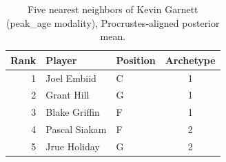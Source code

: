 \begin{table}[htbp]
  \centering\small
  \begin{tabular}{rllc}
    \toprule
    Rank & Player & Position & Archetype \\
    \midrule
    1 & Joel Embiid & C & 1 \\
    2 & Grant Hill & G & 1 \\
    3 & Blake Griffin & F & 1 \\
    4 & Pascal Siakam & F & 2 \\
    5 & Jrue Holiday & G & 2 \\
    \bottomrule
  \end{tabular}
  \caption{Five nearest neighbors of Kevin Garnett (peak_age modality), Procrustes-aligned posterior mean.}
  \label{tab:Kevin_Garnett_neighbors_peak_age}
\end{table}

